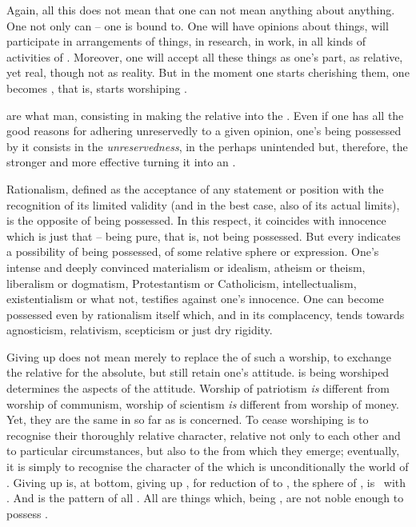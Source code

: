 Again, all this does not mean that one can not mean anything about anything.
One not only can -- one is bound to.  One will have opinions about things, will
participate in arrangements of things, in research, in work, in all kinds of
activities of . Moreover, one will accept all these things as
one's part, as relative, yet  real, though not as 
reality.  But in the moment one starts cherishing them, one becomes
, that is, starts worshiping .

\pa {} are what  man, 
consisting in making the relative into the .
Even if one has all the good reasons for adhering unreservedly
to a given opinion, one's being possessed by it consists in the {\em
  unreservedness}, in the perhaps unintended but, therefore, the stronger and
more effective turning it into an .

Rationalism, defined as the acceptance of any  statement or position
with the recognition of its limited validity (and in the best case, also of its
actual limits), is the opposite of being possessed.  In this respect, it
coincides with innocence which is just that -- being pure, that is, not being
possessed.  But every  indicates a possibility of being possessed,
 of some relative sphere or expression.  One's intense and
deeply convinced materialism or idealism, atheism or theism, liberalism or
dogmatism, Protestantism or Catholicism, intellectualism, existentialism or what
not, testifies against one's innocence.  One can become possessed even by
rationalism itself which,  and  in its 
complacency, tends towards agnosticism, relativism, scepticism or just dry
rigidity.


 Giving up  does not mean merely to replace the
 of such a worship, to exchange the relative for the absolute, but
still retain one's attitude.   is being worshiped determines the
 aspects of the attitude.  Worship of patriotism {\em is} different
from worship of communism, worship of scientism {\em is} different from worship
of money.  Yet, they are the same in so far as  is concerned.  To
cease worshiping  is to recognise their thoroughly relative character,
relative not only to each other and to particular circumstances, but also to the
 from which they emerge; eventually, it is simply to recognise
the  character of the  which is unconditionally 
the world of . Giving up  is, at bottom, giving up
, for reduction of  to , the sphere of
, is \equi\ with . And  is the
pattern of all . All  are things which, being , are not noble enough to possess .


